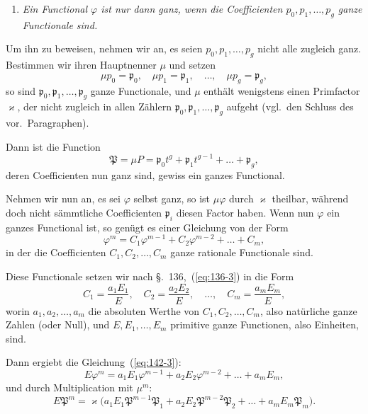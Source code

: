 \documentclass[12pt,a4paper]{article}
\theoremstyle{definition}
\begin{document}
\begin{enumerate}[label=\arabic*., resume]
\item \textit{Ein Functional $\varphi$ ist nur dann ganz, wenn die Coefficienten $p_0,p_1,\dots,p_g$ ganze Functionale sind.}
\end{enumerate}

Um ihn zu beweisen, nehmen wir an, es seien $p_0,p_1,\dots,p_g$ nicht alle zugleich ganz. Bestimmen wir ihren Hauptnenner $\mu$ und setzen
\[
\mu p_0 = \mathfrak{p}_0,\quad \mu p_1 = \mathfrak{p}_1,\quad \dots,\quad \mu p_g = \mathfrak{p}_g,
\]
so sind $\mathfrak{p}_0,\mathfrak{p}_1,\dots,\mathfrak{p}_g$ ganze Functionale, und $\mu$ enthält wenigstens einen Primfactor $\varkappa$, der nicht zugleich in allen Zählern $\mathfrak{p}_0,\mathfrak{p}_1,\dots,\mathfrak{p}_g$ aufgeht (vgl.\ den Schluss des vor.\ Paragraphen).

Dann ist die Function
\begin{equation}\label{eq:142-2}
\mathfrak{P} = \mu P = \mathfrak{p}_0 t^g + \mathfrak{p}_1 t^{g-1} + \dots + \mathfrak{p}_g,
\end{equation}
deren Coefficienten nun ganz sind, gewiss ein ganzes Functional.

Nehmen wir nun an, es sei $\varphi$ selbst ganz, so ist $\mu\varphi$ durch $\varkappa$ theilbar, während doch nicht sämmtliche Coefficienten $\mathfrak{p}_i$ diesen Factor haben. Wenn nun $\varphi$ ein ganzes Functional ist, so genügt es einer Gleichung von der Form
\begin{equation}\label{eq:142-3}
\varphi^m = C_1\varphi^{m-1} + C_2\varphi^{m-2} + \dots + C_m,
\end{equation}
in der die Coefficienten $C_1,C_2,\dots,C_m$ ganze rationale Functionale sind.

Diese Functionale setzen wir nach \S.~136,~(\ref{eq:136-3}) in die Form
\[
C_1 = \frac{a_1E_1}{E},\quad
C_2 = \frac{a_2E_2}{E},\quad \dots,\quad
C_m = \frac{a_mE_m}{E},
\]
worin $a_1,a_2,\dots,a_m$ die absoluten Werthe von $C_1,C_2,\dots,C_m$, also natürliche ganze Zahlen (oder Null), und $E,E_1,\dots,E_m$ primitive ganze Functionen, also Einheiten, sind.

Dann ergiebt die Gleichung~(\ref{eq:142-3}):
\[
E\varphi^m = a_1E_1\varphi^{m-1} + a_2E_2\varphi^{m-2} + \dots + a_mE_m,
\]
und durch Multiplication mit $\mu^m$:
\begin{equation}\label{eq:142-4}
E\mathfrak{P}^m = \varkappa\bigl(a_1E_1\mathfrak{P}^{m-1}\mathfrak{P}_1 + a_2E_2\mathfrak{P}^{m-2}\mathfrak{P}_2 + \dots + a_mE_m\mathfrak{P}_m\bigr).
\end{equation}
\end{document}
